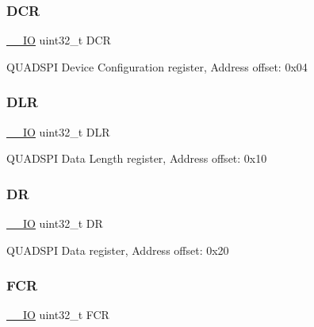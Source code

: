 \subsubsection{\texorpdfstring{D\+CR}{DCR}}
{\footnotesize\ttfamily \mbox{\hyperlink{core__sc300_8h_aec43007d9998a0a0e01faede4133d6be}{\+\_\+\+\_\+\+IO}} uint32\+\_\+t D\+CR}

Q\+U\+A\+D\+S\+PI Device Configuration register, Address offset\+: 0x04 \mbox{\label{struct_q_u_a_d_s_p_i___type_def_a651b3980342dcf21d301d29621dcf4f6}} 
\subsubsection{\texorpdfstring{D\+LR}{DLR}}
{\footnotesize\ttfamily \mbox{\hyperlink{core__sc300_8h_aec43007d9998a0a0e01faede4133d6be}{\+\_\+\+\_\+\+IO}} uint32\+\_\+t D\+LR}

Q\+U\+A\+D\+S\+PI Data Length register, Address offset\+: 0x10 \mbox{\label{struct_q_u_a_d_s_p_i___type_def_a3df0d8dfcd1ec958659ffe21eb64fa94}} 
\subsubsection{\texorpdfstring{DR}{DR}}
{\footnotesize\ttfamily \mbox{\hyperlink{core__sc300_8h_aec43007d9998a0a0e01faede4133d6be}{\+\_\+\+\_\+\+IO}} uint32\+\_\+t DR}

Q\+U\+A\+D\+S\+PI Data register, Address offset\+: 0x20 \mbox{\label{struct_q_u_a_d_s_p_i___type_def_a5d5cc7f32884945503dd29f8f6cbb415}} 
\subsubsection{\texorpdfstring{F\+CR}{FCR}}
{\footnotesize\ttfamily \mbox{\hyperlink{core__sc300_8h_aec43007d9998a0a0e01faede4133d6be}{\+\_\+\+\_\+\+IO}} uint32\+\_\+t F\+CR}

